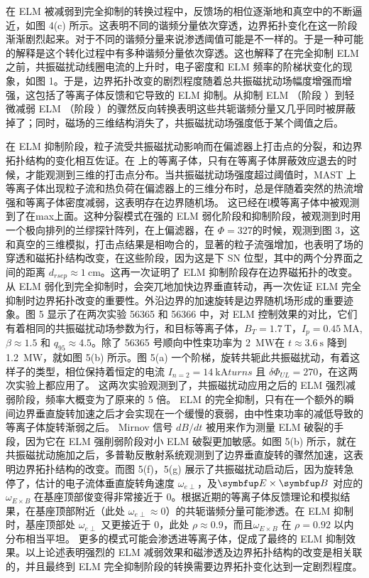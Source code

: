 在 ELM 被减弱到完全抑制的转换过程中，反馈场的相位逐渐地和真空中的不断逼近，如图 4(c) 所示。这表明不同的谐频分量依次穿透，边界拓扑变化在这一阶段渐渐剧烈起来。对于不同的谐频分量来说渗透阈值可能是不一样的。于是一种可能的解释是这个转化过程中有多种谐频分量依次穿透。这也解释了在完全抑制 ELM 之前，共振磁扰动线圈电流的上升时，电子密度和 ELM 频率的阶梯状变化的现象，如图 1。于是，边界拓扑改变的剧烈程度随着总共振磁扰动场幅度增强而增强，这包括了等离子体反馈和它导致的 ELM 抑制。从抑制 ELM （阶段 ）到轻微减弱 ELM （阶段 ）的骤然反向转换表明这些共轭谐频分量又几乎同时被屏蔽掉了；同时，磁场的三维结构消失了，共振磁扰动场强度低于某个阈值之后。

在 ELM 抑制阶段，粒子流受共振磁扰动影响而在偏滤器上打击点的分裂，和边界拓扑结构的变化相互佐证。在 \ddd 上的\Lmode 等离子体，只有在等离子体屏蔽效应退去的时候，才能观测到三维的打击点分布。当共振磁扰动场强度超过阈值时，MAST 上\Lmode 等离子体出现粒子流和热负荷在偏滤器上的三维分布时，总是伴随着突然的热流增强和等离子体密度减弱，这表明存在边界随机场。
这已经在l模等离子体中被观测到了在max上面。这种分裂模式在强的 ELM 弱化阶段和抑制阶段，被观测到时用一个极向排列的兰缪探针阵列，在上偏滤器，在 $\Phi =327$\degree 的时候，观测到图 3，这和真空的三维模拟，打击点结果是相吻合的，显著的粒子流强增加，也表明了场的穿透和磁拓扑结构改变，在这些阶段，因为这是下 SN 位型，其中的两个分界面之间的距离 $d_{rsep}\approx \SI{1}{\centi\metre}$。这再一次证明了 ELM 抑制阶段存在边界磁拓扑的改变。
从 ELM 弱化到完全抑制时，会突兀地加快边界垂直转动，再一次佐证 ELM 完全抑制时边界拓扑改变的重要性。外沿边界的加速旋转是边界随机场形成的重要迹象。图 5 显示了在两次实验 56365 和 56366 中，对 ELM 控制效果的对比，它们有着相同的共振磁扰动场参数为行，和目标等离子体，$B_T=\SI{1.7}{\tesla}$，$I_p=\SI{0.45}{\mega\ampere}$, $\beta\approx 1.5$ 和 $q_{95}\approx 4.5$。除了 56365 号顺向中性束功率为 \SI{2}{\mega\watt}在 $t\approx \SI{3.6}{\second}$ 降到 \SI{1.2}{\mega\watt}，就如图 5(b) 所示。图 5(a) 一个阶梯，旋转共轭此共振磁扰动，有着这样子的类型，相位保持着恒定的电流 $I_{n=2}=\SI{14}{\kilo\ampere turns}$ 且 $\delta\Phi_{UL}=270$\degree，在这两次实验上都应用了。
这两次实验观测到了，共振磁扰动应用之后的 ELM 强烈减弱阶段，频率大概变为了原来的 5 倍。 ELM 的完全抑制，只有在一个额外的瞬间边界垂直旋转加速之后才会实现在一个缓慢的衰弱，由中性束功率的减低导致的等离子体旋转渐弱之后。 Mirnov 信号 $dB/dt$ 被用来作为测量 ELM 破裂的手段，因为它在 ELM 强削弱阶段对小 ELM 破裂更加敏感。如图 5(b) 所示，就在共振磁扰动施加之后，多普勒反散射系统观测到了边界垂直旋转的骤然加速，这表明边界拓扑结构的改变。而图 5(f)，5(g) 展示了共振磁扰动启动后，因为旋转急停了，估计的电子流体垂直旋转角速度 $\omega_{e\perp}$，及$\vect{E}\times\vect{B}$ 对应的 $\omega_{E\times B}$ 在基座顶部俊变得非常接近于 0。根据近期的等离子体反馈理论和模拟结果，在基座顶部附近（此处 $\omega_{e\perp}\approx 0$）的共轭谐频分量可能渗透。在 ELM 抑制时，基座顶部处 $\omega_{e\perp}$ 又更接近于 0，此处 $\rho \approx 0.9$，而且$\omega_{E\times B}$ 在 $\rho=0.92$ 以内分布相当平坦。
更多的模式可能会渗透进等离子体，促成了最终的 ELM 抑制效果。以上论述表明强烈的 ELM 减弱效果和磁渗透及边界拓扑结构的改变是相关联的，并且最终到 ELM 完全抑制阶段的转换需要边界拓扑变化达到一定剧烈程度。


